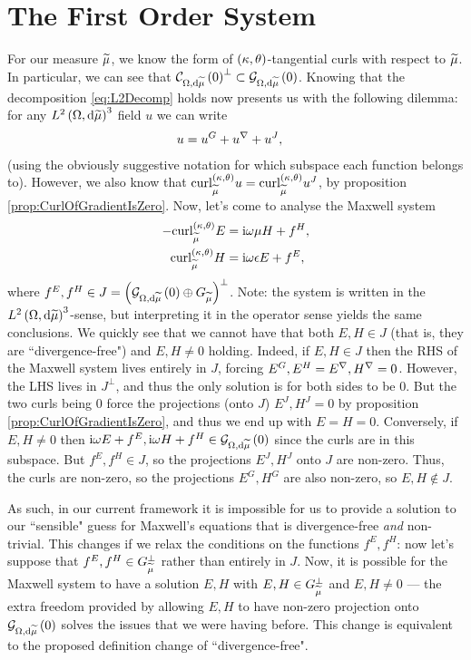 \documentclass[11pt]{report}
\renewcommand{\ktcurl}[1]{\mathrm{curl}^{\kt}_{#1}}
\begin{document}
\section*{The First Order System}
For our measure $\widetilde{\mu}$, we know the form of $\left( \kappa, \theta \right)$-tangential curls with respect to $\widetilde{\mu}$.
In particular, we can see that $\mathcal{C}_{ \Omega, \mathrm{d}\widetilde{\mu}}\left( 0 \right)^{\perp} \subset \mathcal{G}_{ \Omega, \mathrm{d}\widetilde{\mu}}\left( 0 \right)$.
Knowing that the decomposition \eqref{eq:L2Decomp} holds now presents us with the following dilemma: for any $L^{2}\left( \Omega,\mathrm{d}\widetilde{\mu} \right)^3$ field $u$ we can write
\begin{align*}
	u &= u^{G} + u^{\nabla} + u^{J},
\end{align*}
(using the obviously suggestive notation for which subspace each function belongs to).
However, we also know that $\ktcurl{\dddmes}u = \ktcurl{\dddmes}u^J$, by proposition \ref{prop:CurlOfGradientIsZero}.
Now, let's come to analyse the Maxwell system
\begin{align*}
	-\ktcurl{\dddmes}E &= \rmi\omega\mu H + f^H, \\
	\ktcurl{\dddmes}H &= \rmi\omega\epsilon E + f^E,
\end{align*}
where $f^E,f^H\in J = \left(  \mathcal{G}_{ \Omega, \mathrm{d}\widetilde{\mu}}\left( 0 \right) \oplus G_{\widetilde{\mu}} \right)^\perp$.
Note: the system is written in the $L^{2}\left( \Omega,\mathrm{d}\widetilde{\mu} \right)^3$-sense, but interpreting it in the operator sense yields the same conclusions.
We quickly see that we cannot have that both $E,H\in J$ (that is, they are ``divergence-free") and $E,H\neq 0$ holding.
Indeed, if $E,H\in J$ then the RHS of the Maxwell system lives entirely in $J$, forcing $E^G,E^H=E^\nabla,H^\nabla=0$.
However, the LHS lives in $J^\perp$, and thus the only solution is for both sides to be 0.
But the two curls being 0 force the projections (onto $J$) $E^J,H^J=0$ by proposition \ref{prop:CurlOfGradientIsZero}, and thus we end up with $E=H=0$.
Conversely, if $E,H\neq 0$ then $\mathrm{i}\omega E + f^E, \mathrm{i}\omega H + f^H\in\mathcal{G}_{ \Omega, \mathrm{d}\widetilde{\mu}}\left( 0 \right)$ since the curls are in this subspace.
But $f^E,f^H\in J$, so the projections $E^J,H^J$ onto $J$ are non-zero.
Thus, the curls are non-zero, so the projections $E^G, H^G$ are also non-zero, so $E,H\not\in J$.

As such, in our current framework it is impossible for us to provide a solution to our ``sensible" guess for Maxwell's equations that is divergence-free \emph{and} non-trivial.
This changes if we relax the conditions on the functions $f^E,f^H$: now let's suppose that $f^E,f^H\in G_{\widetilde{\mu}}^\perp$ rather than entirely in $J$.
Now, it is possible for the Maxwell system to have a solution $E,H$ with $E,H\in G_{\widetilde{\mu}}^\perp$ and $E,H\neq 0$ --- the extra freedom provided by allowing $E,H$ to have non-zero projection onto $\mathcal{G}_{ \Omega, \mathrm{d}\widetilde{\mu}}\left( 0 \right)$ solves the issues that we were having before.
This change is equivalent to the proposed definition change of ``divergence-free".
\end{document}
